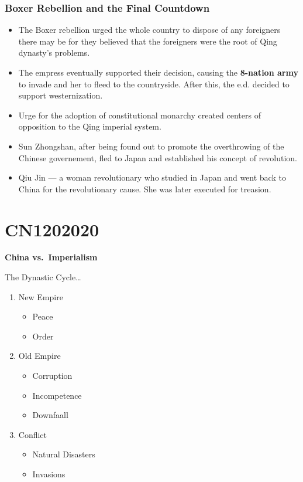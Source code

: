 \documentclass[letterpaper]{article}
\begin{document}
\subsubsection{Boxer Rebellion and the Final Countdown}
\label{sec:orgc49c3ed}
\begin{itemize}
\item The Boxer rebellion urged the whole country to dispose of any
foreigners there may be for they believed that the foreigners were the
root of Qing dynasty's problems.
\item The empress eventually supported their decision, causing the \textbf{8-nation
army} to invade and her to fleed to the countryside. After this, the
e.d. decided to support westernization.
\item Urge for the adoption of constitutional monarchy created centers of
opposition to the Qing imperial system.
\item Sun Zhongshan, after being found out to promote the overthrowing of
the Chinese governement, fled to Japan and established his concept of
revolution.
\item Qiu Jin --- a woman revolutionary who studied in Japan and went back
to China for the revolutionary cause. She was later executed for
treasion.
\end{itemize}

\section{CN1202020}
\label{sec:org030d5f1}
\textbf{China vs. Imperialism}

The Dynastic Cycle\ldots{}

\begin{enumerate}
\item New Empire

\begin{itemize}
\item Peace
\item Order
\end{itemize}

\item Old Empire

\begin{itemize}
\item Corruption
\item Incompetence
\item Downfaall
\end{itemize}

\item Conflict

\begin{itemize}
\item Natural Disasters
\item Invasions
\end{itemize}
\end{enumerate}
\end{document}

